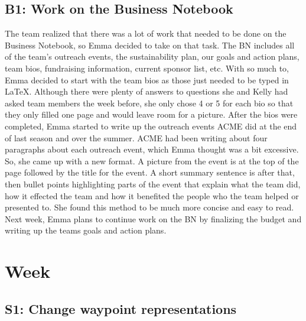 \documentclass{article}
\begin{document}
\subsection{B1: Work on the Business Notebook}

The team realized that there was a lot of work that needed to be done on the Business Notebook, so Emma decided to take on that task. The BN includes all of the team's outreach events, the sustainability plan, our goals and action plans, team bios, fundraising information, current sponsor list, etc. With so much to, Emma decided to start with the team bios as those just needed to be typed in \LaTeX . Although there were plenty of answers to questions she and Kelly had asked team members the week before, she only chose 4 or 5 for each bio so that they only filled one page and would leave room for a picture. After the bios were completed, Emma started to write up the outreach events ACME did at the end of last season and over the summer. ACME had been writing about four paragraphs about each outreach event, which Emma thought was a bit excessive. So, she came up with a new format. A picture from the event is at the top of the page followed by the title for the event. A short summary sentence is after that, then bullet points highlighting parts of the event that explain what the team did, how it effected the team and how it benefited the people who the team helped or presented to. She found this method to be much more concise and easy to read. Next week, Emma plans to continue work on the BN by finalizing the budget and writing up the teams goals and action plans. \clearpage \newpage \section{Week \thesection} 
\subsection{S1: Change waypoint representations}
\end{document}
